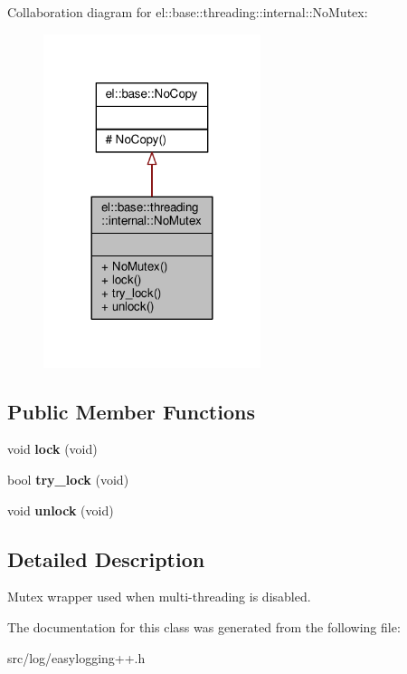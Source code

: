 Collaboration diagram for el\+:\+:base\+:\+:threading\+:\+:internal\+:\+:No\+Mutex\+:
\nopagebreak
\begin{figure}[H]
\begin{center}
\leavevmode
\includegraphics[width=180pt]{d7/dec/classel_1_1base_1_1threading_1_1internal_1_1NoMutex__coll__graph}
\end{center}
\end{figure}
\subsection*{Public Member Functions}
\begin{DoxyCompactItemize}
\item 
void {\bfseries lock} (void)\hypertarget{classel_1_1base_1_1threading_1_1internal_1_1NoMutex_a3b38e4e9411c924daa70d358cf561b3c}{}\label{classel_1_1base_1_1threading_1_1internal_1_1NoMutex_a3b38e4e9411c924daa70d358cf561b3c}

\item 
bool {\bfseries try\+\_\+lock} (void)\hypertarget{classel_1_1base_1_1threading_1_1internal_1_1NoMutex_a4c0c35a99cf41f26a7608fed5609d6ae}{}\label{classel_1_1base_1_1threading_1_1internal_1_1NoMutex_a4c0c35a99cf41f26a7608fed5609d6ae}

\item 
void {\bfseries unlock} (void)\hypertarget{classel_1_1base_1_1threading_1_1internal_1_1NoMutex_a5a248c97fee2ef0087526f2f8d3cd26e}{}\label{classel_1_1base_1_1threading_1_1internal_1_1NoMutex_a5a248c97fee2ef0087526f2f8d3cd26e}

\end{DoxyCompactItemize}


\subsection{Detailed Description}
Mutex wrapper used when multi-\/threading is disabled. 

The documentation for this class was generated from the following file\+:\begin{DoxyCompactItemize}
\item 
src/log/easylogging++.\+h\end{DoxyCompactItemize}
